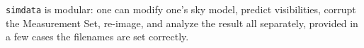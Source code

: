 {\tt simdata} is modular: one can
modify one's sky model, predict visibilities, corrupt the Measurement
Set, re-image, and analyze the result all separately, provided in a
few cases the filenames are set correctly.  
%
%
%
%
%
%
%
